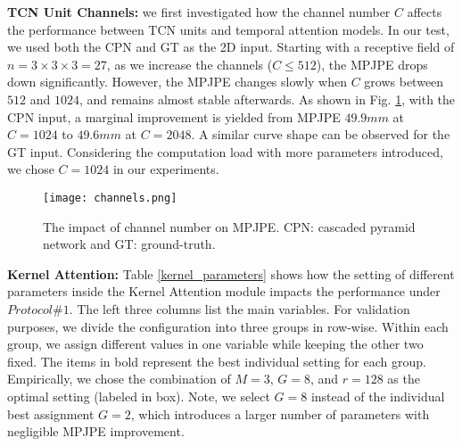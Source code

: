 \documentclass[twocolumn]{svjour3}          \smartqed  \usepackage{graphicx}
\begin{document}
{\bf TCN Unit Channels: } we first investigated how the channel number $C$ affects the performance between TCN units and temporal attention models. In our test, we used both the CPN and GT as the 2D input. Starting with a receptive field of $n=3\times3\times3=27$, as we increase the channels ($C \leq 512$), the MPJPE drops down significantly. However, the MPJPE changes slowly when $C$ grows between $512$ and $1024$, and remains almost stable afterwards. As shown in Fig. \ref{channels}, with the CPN input, a marginal improvement is yielded from MPJPE $49.9mm$ at $C = 1024$ to $49.6mm$ at $C = 2048$. A similar curve shape can be observed for the GT input. Considering the computation load with more parameters introduced, we chose $C = 1024$ in our experiments.


\begin{figure}[ht]
\begin{center}
   \texttt{[image: channels.png]}
\end{center}
   \caption{The impact of channel number on MPJPE. CPN: cascaded pyramid network and GT: ground-truth.}\label{channels}
\end{figure}


{\bf Kernel Attention: } Table \ref{kernel_parameters} shows how the setting of different parameters inside the Kernel Attention module impacts the performance under $Protocol \#1$. The left three columns list the main variables. For validation purposes, we divide the configuration into three groups in row-wise. Within each group, we assign different values in one variable while keeping the other two fixed. The items in bold represent the best individual setting for each group. Empirically, we chose the combination of $M = 3$, $G = 8$, and $r = 128$ as the optimal setting (labeled in box). Note,  we select $G = 8$ instead of the individual best assignment $G = 2$, which introduces a larger number of parameters with negligible MPJPE improvement. 
\end{document}
